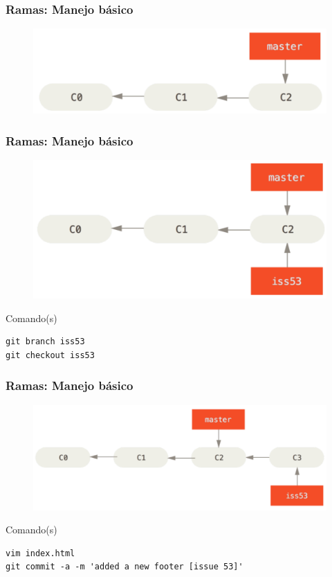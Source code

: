 \documentclass{beamer}
\begin{document}
\begin{frame}
\frametitle{Ramas: Manejo básico}
\begin{figure}
\includegraphics[width=0.85\linewidth]{img/branching-1.png}
\end{figure}
\end{frame}

\begin{frame}[fragile]
\frametitle{Ramas: Manejo básico}
\begin{figure}
\includegraphics[width=0.85\linewidth]{img/branching-2.png}
\end{figure}
\vskip 0.50cm
\footnotesize
\begin{block}{Comando(s)}
\begin{verbatim}
git branch iss53
git checkout iss53
\end{verbatim}
\end{block}
\end{frame}

\begin{frame}[fragile]
\frametitle{Ramas: Manejo básico}
\begin{figure}
\includegraphics[width=0.85\linewidth]{img/branching-3.png}
\end{figure}
\vskip 0.50cm
\footnotesize
\begin{block}{Comando(s)}
\begin{verbatim}
vim index.html
git commit -a -m 'added a new footer [issue 53]'
\end{verbatim}
\end{block}
\end{frame}
\end{document}
